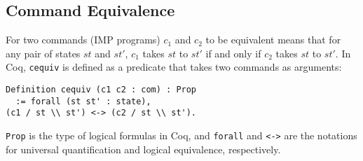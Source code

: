 \documentclass[compsoc,conference,a4paper,10pt,times]{IEEEtran}
\begin{document}




\subsection{Command Equivalence}\label{commequiv} 
    For two commands (IMP programs) $c_1$ and $c_2$ to be equivalent means that for any pair of states $st$ and $st'$, $c_1$ takes $st$ to $st'$ if and only if $c_2$ takes $st$ to $st'$.  In Coq, \texttt{cequiv}\cite{SFV2}  is defined as a predicate that takes two commands as arguments:
\begin{verbatim}
Definition cequiv (c1 c2 : com) : Prop 
  := forall (st st' : state), 
(c1 / st \\ st') <-> (c2 / st \\ st').
\end{verbatim}
\texttt{Prop} is the type of logical formulas in Coq, and \texttt{forall} and \texttt{<->} are the notations for universal quantification and logical equivalence, respectively.
\end{document}
